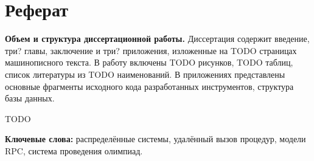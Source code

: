 \chapter*{Реферат}
\textbf{Объем и структура диссертационной работы.}
Диссертация содержит введение, три? главы, заключение и три? приложения,
изложенные на TODO страницах машинописного текста.
В работу включены TODO рисунков, TODO таблиц,
список литературы из TODO наименований.
В приложениях представлены основные фрагменты исходного кода
разработанных инструментов, структура базы данных.

TODO

\textbf{Ключевые слова:}
распределённые системы,
удалённый вызов процедур,
модели RPC,
система проведения олимпиад.
